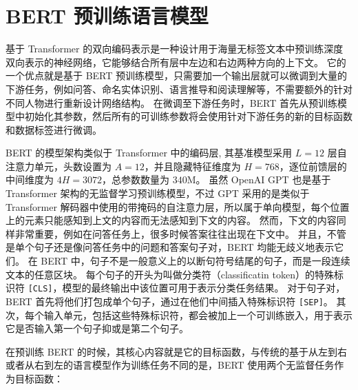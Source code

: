 \section{BERT 预训练语言模型}
基于 Transformer 的双向编码表示是一种设计用于海量无标签文本中预训练深度双向表示的神经网络，它能够结合所有层中左边和右边两种方向的上下文。
它的一个优点就是基于 BERT 预训练模型，只需要加一个输出层就可以微调到大量的下游任务，例如问答、命名实体识别、语言推导和阅读理解等，不需要额外的针对不同人物进行重新设计网络结构。
在微调至下游任务时，BERT 首先从预训练模型中初始化其参数，然后所有的可训练参数将会使用针对下游任务的新的目标函数和数据标签进行微调。

BERT 的模型架构类似于 Transformer 中的编码层, 其基准模型采用 $L=12$ 层自注意力单元，头数设置为 $A=12$，并且隐藏特征维度为 $H=768$，逐位前馈层的中间维度为 $4H = 3072$，总参数数量为 $340$M。
虽然 OpenAI GPT\cite{GPT} 也是基于 Transformer 架构的无监督学习预训练模型，不过 GPT 采用的是类似于 Transformer 解码器中使用的带掩码的自注意力层，所以属于单向模型，每个位置上的元素只能感知到上文的内容而无法感知到下文的内容。
然而，下文的内容同样非常重要，例如在问答任务上，很多时候答案往往出现在下文中。
并且，不管是单个句子还是像问答任务中的问题和答案句子对，BERT 均能无歧义地表示它们。
在 BERT 中，句子不是一般意义上的以断句符号结尾的句子，而是一段连续文本的任意区块。
每个句子的开头为叫做分类符（classificatin token）的特殊标识符 \texttt{[CLS]}，模型的最终输出中该位置可用于表示分类任务结果。
对于句子对，BERT 首先将他们打包成单个句子，通过在他们中间插入特殊标识符 \texttt{[SEP]}。
其次，每个输入单元，包括这些特殊标识符，都会被加上一个可训练嵌入，用于表示它是否输入第一个句子抑或是第二个句子。

在预训练 BERT 的时候，其核心内容就是它的目标函数，与传统的基于从左到右或者从右到左的语言模型作为训练任务不同的是，BERT 使用两个无监督任务作为目标函数：

